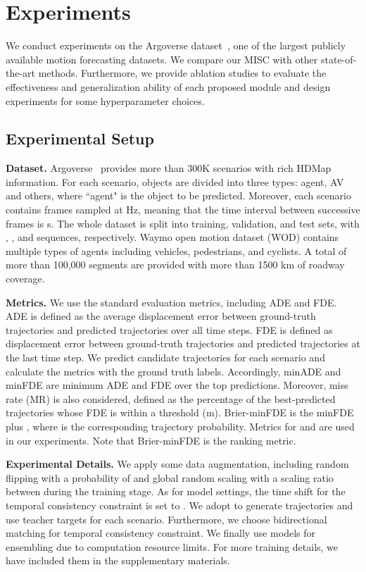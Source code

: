 \documentclass[10pt,twocolumn,letterpaper]{article}
\begin{document}
\section{Experiments}

We conduct experiments on the Argoverse dataset~\cite{chang2019argoverse}, one of the largest publicly available motion forecasting datasets. We compare our MISC with other state-of-the-art methods. Furthermore, we provide ablation studies to evaluate the effectiveness and generalization ability of each proposed module and design experiments for some hyperparameter choices.

\subsection{Experimental Setup}
\label{sec:exp_setup}
\noindent\textbf{Dataset.} Argoverse~\cite{chang2019argoverse}  provides more than 300K scenarios with rich HDMap information. For each scenario, objects are divided into three types: agent, AV and others, where  ``agent" is the object to be predicted. Moreover, each scenario contains  frames sampled at  Hz, meaning that the time interval between successive frames is s. 
The whole dataset is split into training, validation, and test sets, with , , and  sequences, respectively. 
 Waymo open motion dataset (WOD) contains multiple types of agents including vehicles, pedestrians, and cyclists. A total of more than 100,000 segments are provided with more than 1500 km of roadway coverage.


\noindent\textbf{Metrics.} 
We use the standard evaluation metrics, including ADE and FDE. ADE is defined as the average displacement error between ground-truth trajectories and predicted trajectories over all time steps. FDE is defined as displacement error between ground-truth trajectories and predicted trajectories at the last time step. 
We predict  candidate trajectories for each scenario and calculate the metrics with the ground truth labels. Accordingly, minADE and minFDE are minimum ADE and FDE over the top  predictions. Moreover, miss rate (MR) is also considered, defined as the percentage of the best-predicted trajectories whose FDE is within a threshold (m). Brier-minFDE is the minFDE plus , where  is the corresponding trajectory probability. Metrics for  and  are used in our experiments. Note that Brier-minFDE is the ranking metric.

\noindent\textbf{Experimental Details.} We apply some data augmentation, including random flipping with a probability of  and global random scaling with a scaling ratio between  during the training stage. As for model settings, the time shift  for the temporal consistency constraint is set to . We adopt  to generate  trajectories and use  teacher targets for each scenario. Furthermore, we choose bidirectional matching for temporal consistency constraint. We finally use  models for ensembling due to computation resource limits. For more training details, we have included them in the supplementary materials. 
\end{document}

